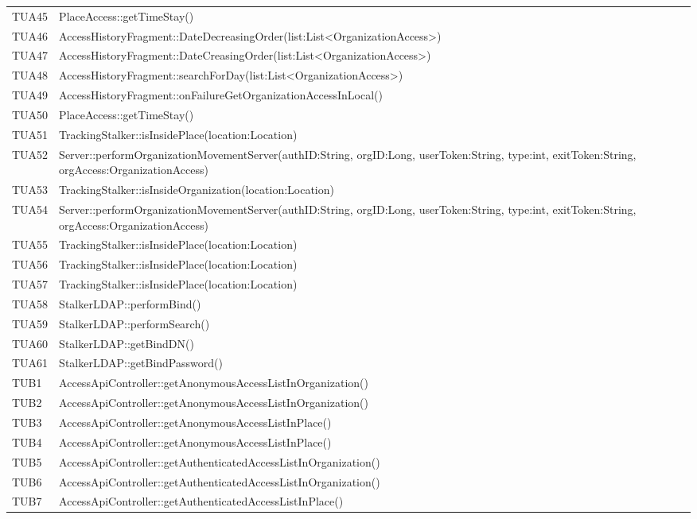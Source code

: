 {\begin{longtable}{C{2cm} C{12cm}}
		TUA45 & PlaceAccess::getTimeStay()\\
		TUA46 & AccessHistoryFragment::DateDecreasingOrder(list:List<OrganizationAccess>)\\
		TUA47 & AccessHistoryFragment::DateCreasingOrder(list:List<OrganizationAccess>)\\
		TUA48 & AccessHistoryFragment::searchForDay(list:List<OrganizationAccess>)\\
		TUA49 & AccessHistoryFragment::onFailureGetOrganizationAccessInLocal()\\
		TUA50 & PlaceAccess::getTimeStay()\\
		TUA51 & TrackingStalker::isInsidePlace(location:Location)\\
		TUA52 & Server::performOrganizationMovementServer(authID:String, orgID:Long, userToken:String, type:int, exitToken:String, orgAccess:OrganizationAccess)\\
		TUA53 & TrackingStalker::isInsideOrganization(location:Location)\\
		TUA54 & Server::performOrganizationMovementServer(authID:String, orgID:Long, userToken:String, type:int, exitToken:String, orgAccess:OrganizationAccess)\\
		TUA55 & TrackingStalker::isInsidePlace(location:Location)\\
		TUA56 & TrackingStalker::isInsidePlace(location:Location)\\
		TUA57 & TrackingStalker::isInsidePlace(location:Location)\\
		TUA58 & StalkerLDAP::performBind()\\
		TUA59 & StalkerLDAP::performSearch()\\
		TUA60 & StalkerLDAP::getBindDN()\\
		TUA61 & StalkerLDAP::getBindPassword()\\
		TUB1 & AccessApiController::getAnonymousAccessListInOrganization()\\
		TUB2 & AccessApiController::getAnonymousAccessListInOrganization()\\
		TUB3 & AccessApiController::getAnonymousAccessListInPlace()\\
		TUB4 & AccessApiController::getAnonymousAccessListInPlace()\\
		TUB5 & AccessApiController::getAuthenticatedAccessListInOrganization()\\
		TUB6 & AccessApiController::getAuthenticatedAccessListInOrganization()\\
		TUB7 & AccessApiController::getAuthenticatedAccessListInPlace()\\

\end{longtable}}
